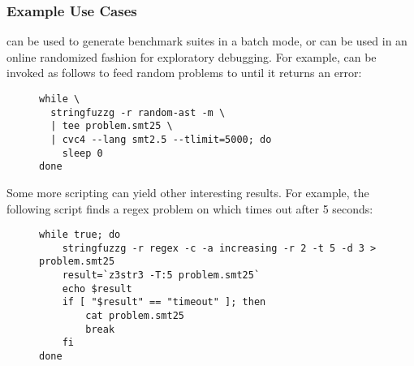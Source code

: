 \subsubsection{Example Use Cases}

\fuzzer{} can be used to
generate benchmark suites in a batch mode, or can be used in an online
randomized fashion for exploratory debugging. For example, \fuzzer{}
can be invoked as follows to feed random problems to \cvc{} until it
returns an error:
\vspace{-0.15in}
\begin{figure}[H]
    \centering
    \begin{minipage}[b]{0.91\linewidth}
        \begin{verbatim}
while \
  stringfuzzg -r random-ast -m \
  | tee problem.smt25 \
  | cvc4 --lang smt2.5 --tlimit=5000; do
    sleep 0
done
        \end{verbatim}
    \end{minipage}
\end{figure}
\vspace{-0.15in}

Some more \unix{} scripting can yield other interesting results. For
example, the following script finds a regex problem on which \us{}
times out after 5 seconds:
\vspace{-0.15in}
\begin{figure}[H]
    \centering
    \begin{minipage}[b]{0.91\linewidth}
        \begin{verbatim}
while true; do
    stringfuzzg -r regex -c -a increasing -r 2 -t 5 -d 3 > problem.smt25
    result=`z3str3 -T:5 problem.smt25`
    echo $result
    if [ "$result" == "timeout" ]; then
        cat problem.smt25
        break
    fi
done
        \end{verbatim}
    \end{minipage}
\end{figure}
\vspace{-0.15in}
